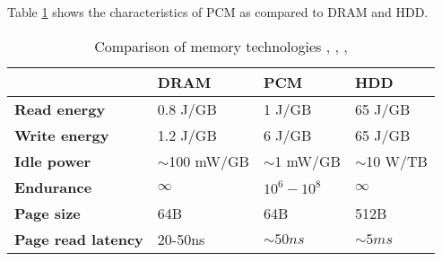 Table \ref{tab:tab_pcm_char} shows the characteristics of PCM as compared to DRAM and HDD.
                                                                                                          
\begin{table}[!h]                                                                                       
\centering                                                                                              
                                                                                                          
                                                                                                          
\caption{Comparison of memory technologies \cite{qureshi}, \cite{lee}, \cite{numonyx}, \cite{chen}}
  \label{tab:tab_pcm_char}                                                                                
  \begin{small}                                                                                           
  \begin{tabular}{p{2.25cm}p{1.4cm}p{1.6cm}p{1.6cm}}
  \toprule                                                                                                
  
    &  \textbf{DRAM} & \textbf{PCM} &  \textbf{HDD} \\
  \midrule                                                                                                
  
  \textbf{Read energy} & 0.8 J/GB & 1 J/GB  & 65 J/GB \\ 
  
  \textbf{Write energy} & 1.2 J/GB & 6 J/GB  & 65 J/GB \\   
  
  \textbf{Idle power} & $\sim$100 mW/GB & $\sim$1 mW/GB  & $\sim$10 W/TB \\ 
  
  \textbf{Endurance} & $\infty$ & $10^6 - 10^8$  & $\infty$ \\                                            
  
  \textbf{Page size} & 64B & 64B  & 512B \\                                                               
  
  \textbf{Page read latency}& 20-50ns & $\sim 50ns$  & $\sim 5ms$ \\  
  

\end{tabular}
\end{small}
\end{table}
